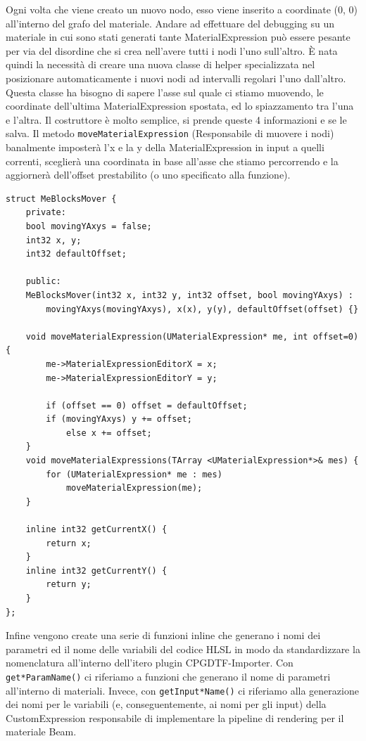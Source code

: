 \documentclass[main.tex]{subfiles}
\begin{document}
Ogni volta che viene creato un nuovo nodo, esso viene inserito a coordinate (0, 0) all'interno del grafo del materiale. Andare ad effettuare del debugging su un materiale in cui sono stati generati tante MaterialExpression può essere pesante per via del disordine che si crea nell'avere tutti i nodi l'uno sull'altro. È nata quindi la necessità di creare una nuova classe di helper specializzata nel posizionare automaticamente i nuovi nodi ad intervalli regolari l'uno dall'altro. 
Questa classe ha bisogno di sapere l'asse sul quale ci stiamo muovendo, le coordinate dell'ultima MaterialExpression spostata, ed lo spiazzamento tra l'una e l'altra. Il costruttore è molto semplice, si prende queste 4 informazioni e se le salva. Il metodo \lstinline{moveMaterialExpression} (Responsabile di muovere i nodi) banalmente imposterà l'x e la y della MaterialExpression in input a quelli correnti, sceglierà una coordinata in base all'asse che stiamo percorrendo e la aggiornerà dell'offset prestabilito (o uno specificato alla funzione).
\clearpage %
\begin{lstlisting}
struct MeBlocksMover {
    private:
    bool movingYAxys = false;
    int32 x, y;
    int32 defaultOffset;

    public:
    MeBlocksMover(int32 x, int32 y, int32 offset, bool movingYAxys) :
        movingYAxys(movingYAxys), x(x), y(y), defaultOffset(offset) {}

    void moveMaterialExpression(UMaterialExpression* me, int offset=0) {
        me->MaterialExpressionEditorX = x;
        me->MaterialExpressionEditorY = y;

        if (offset == 0) offset = defaultOffset;
        if (movingYAxys) y += offset;
            else x += offset;
    }
    void moveMaterialExpressions(TArray <UMaterialExpression*>& mes) {
        for (UMaterialExpression* me : mes)
            moveMaterialExpression(me);
    }

    inline int32 getCurrentX() {
        return x;
    }
    inline int32 getCurrentY() {
        return y;
    }
};
\end{lstlisting}

Infine vengono create una serie di funzioni inline che generano i nomi dei parametri ed il nome delle variabili del codice HLSL in modo da standardizzare la nomenclatura all'interno dell'itero plugin CPGDTF-Importer. Con \lstinline{get*ParamName()} ci riferiamo a funzioni che generano il nome di parametri all'interno di materiali. Invece, con \lstinline{getInput*Name()} ci riferiamo alla generazione dei nomi per le variabili (e, conseguentemente, ai nomi per gli input) della CustomExpression responsabile di implementare la pipeline di rendering per il materiale Beam.
\end{document}
